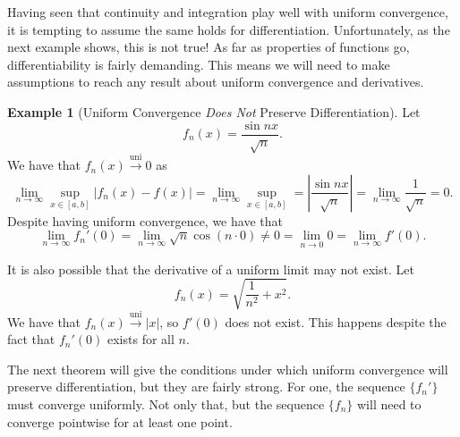 \documentclass{article}
\newcommand{\uni}{\overset{\text{uni}}{\to}}
\theoremstyle{definition}
\newtheorem{example}{Example}[section]
\begin{document}
Having seen that continuity and integration play well with uniform convergence, it is tempting to assume the same holds for differentiation. Unfortunately, as the next example shows, this is not true! As far as properties of functions go, differentiability is fairly demanding. This means we will need to make assumptions to reach any result about uniform convergence and derivatives. 
\begin{example}[Uniform Convergence \textit{Does Not} Preserve Differentiation]
Let $$ f_n(x)=\frac{\sin nx}{\sqrt{n}}. $$ We have that $ f_n(x)\uni 0 $ as  $$  \lim\limits_{n\to\infty}\sup_{x\in [a,b]}|f_n(x)-f(x)|=\lim\limits_{n\to\infty}\sup_{x\in [a,b]}=	\left\lvert \frac{\sin nx}{\sqrt{n}} \right\rvert=\lim\limits_{n\to\infty}\frac{1}{\sqrt{n}}=0.$$ Despite having uniform convergence, we have that $$ \lim_{n\to\infty}f_n'(0)=\lim_{n\to\infty}\sqrt{n}\cos (n
\cdot0)\neq 0=\lim_{n\to 0}0=\lim_{n\to\infty}f'(0).$$

It is also possible that the derivative of a uniform limit may not exist. Let $$ f_n(x)=\sqrt{\frac{1}{n^2}+x^2}.$$ We have that $ f_n(x)\uni|x| $, so $ f'(0) $ does not exist. This happens despite the fact that $ f_n'(0) $ exists for all $ n $. 
\end{example}

The next theorem will give the conditions under which uniform convergence will preserve differentiation, but they are fairly strong. For one, the sequence $ \{f_n'\} $ must converge uniformly. Not only that, but the sequence $ \{f_n\} $ will need to converge pointwise for at least one point.  
\end{document}
